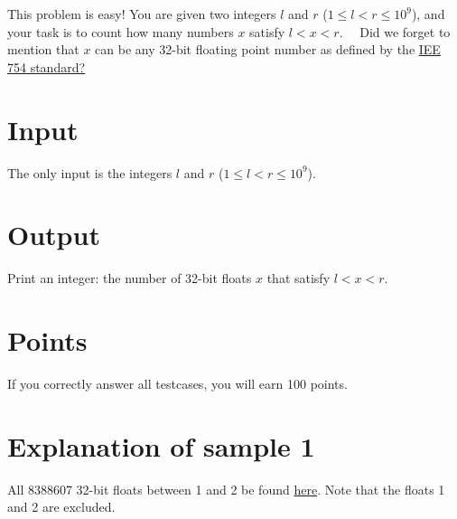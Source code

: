 \noindent

This problem is easy! You are given two integers $l$ and $r$ ($1 \leq l < r \leq 10^9$), and your task
is to count how many numbers $x$ satisfy $l < x < r$.
\
\
Did we forget to mention that $x$ can be any 32-bit floating point number as defined by the
\href{https://sci-hub.3800808.com/10.1109/ieeestd.2008.4610935}{IEE 754 standard?}


\section*{Input}
\noindent
The only input is the integers $l$ and $r$ ($1 \leq l < r \leq 10^9$).

\section*{Output}
\noindent
Print an integer: the number of 32-bit floats $x$ that satisfy $l < x < r$.


\section*{Points}
If you correctly answer all testcases, you will earn 100 points.

\section*{Explanation of sample 1}
All 8388607 32-bit floats between 1 and 2 be found \href{https://drive.google.com/file/d/1VAeaR44GEhSPsfwSVIbh_U-8YkdktChb/view?usp=drive_link}{here}.
Note that the floats 1 and 2 are excluded.
